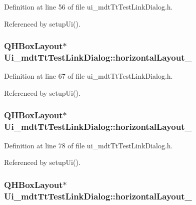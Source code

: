 Definition at line 56 of file ui\-\_\-mdt\-Tt\-Test\-Link\-Dialog.\-h.



Referenced by setup\-Ui().

\hypertarget{class_ui__mdt_tt_test_link_dialog_abe2a762a5cb03dff5b24324656c85dc0}{
\subsubsection[{horizontal\-Layout\-\_\-3}]{\setlength{\rightskip}{0pt plus 5cm}Q\-H\-Box\-Layout$\ast$ Ui\-\_\-mdt\-Tt\-Test\-Link\-Dialog\-::horizontal\-Layout\-\_}}\label{class_ui__mdt_tt_test_link_dialog_abe2a762a5cb03dff5b24324656c85dc0}


Definition at line 67 of file ui\-\_\-mdt\-Tt\-Test\-Link\-Dialog.\-h.



Referenced by setup\-Ui().

\hypertarget{class_ui__mdt_tt_test_link_dialog_acd19484fc8f124d7b5fe9a9a54196d71}{
\subsubsection[{horizontal\-Layout\-\_\-4}]{\setlength{\rightskip}{0pt plus 5cm}Q\-H\-Box\-Layout$\ast$ Ui\-\_\-mdt\-Tt\-Test\-Link\-Dialog\-::horizontal\-Layout\-\_}}\label{class_ui__mdt_tt_test_link_dialog_acd19484fc8f124d7b5fe9a9a54196d71}


Definition at line 78 of file ui\-\_\-mdt\-Tt\-Test\-Link\-Dialog.\-h.



Referenced by setup\-Ui().

\hypertarget{class_ui__mdt_tt_test_link_dialog_a95dd2f012e102d301bc5d74b35dd1e99}{
\subsubsection[{horizontal\-Layout\-\_\-5}]{\setlength{\rightskip}{0pt plus 5cm}Q\-H\-Box\-Layout$\ast$ Ui\-\_\-mdt\-Tt\-Test\-Link\-Dialog\-::horizontal\-Layout\-\_}}\label{class_ui__mdt_tt_test_link_dialog_a95dd2f012e102d301bc5d74b35dd1e99}


